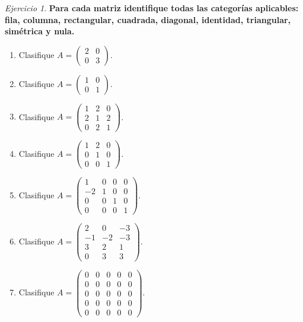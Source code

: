 \documentclass[12pt]{article}
\theoremstyle{remark}
\newtheorem{Ejer}[definicion]{Ejercicio}
\begin{document}
\begin{Ejer}

\textbf{Para cada matriz identifique todas las categorías aplicables: fila, columna, rectangular, cuadrada, diagonal, identidad, triangular, simétrica y nula.}
\begin{enumerate}[resume=banco]

\item Clasifique $A=\begin{pmatrix}2&0\\0&3\end{pmatrix}$.

\item Clasifique $A=\begin{pmatrix}1&0\\0&1\end{pmatrix}$.

\item Clasifique $A=\begin{pmatrix}1&2&0\\2&1&2\\0&2&1\end{pmatrix}$.

\item Clasifique $A=\begin{pmatrix}1&2&0\\0&1&0\\0&0&1\end{pmatrix}$.

\item Clasifique $A=\begin{pmatrix}1&0&0&0\\-2&1&0&0\\0&0&1&0\\0&0&0&1\end{pmatrix}$.

\item Clasifique $A=\begin{pmatrix}2&0&-3\\-1&-2&-3\\3&2&1\\0&3&3\end{pmatrix}$.

\item Clasifique $A=\begin{pmatrix}0&0&0&0&0\\0&0&0&0&0\\0&0&0&0&0\\0&0&0&0&0\\0&0&0&0&0\end{pmatrix}$.


\end{enumerate}
\end{Ejer}
\end{document}
